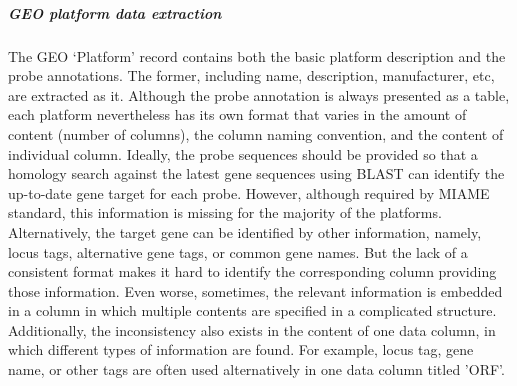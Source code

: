 \subparagraph{GEO platform data extraction}
%
The GEO `Platform' record contains both the basic platform description and the
probe annotations.
%
The former, including name, description, manufacturer, etc, are extracted as
it.
%
Although the probe annotation is always presented as a table, each platform
nevertheless has its own format that varies in the amount of content (number
of columns), the column naming convention, and the content of individual
column.
%
Ideally, the probe sequences should be provided so that a homology search
against the latest gene sequences using BLAST \cite{Altschul1997} can identify
the up-to-date gene target for each probe.
%
However, although required by MIAME\cite{Brazma2001} standard, this information
is missing for the majority of the platforms.
%
Alternatively, the target gene can be identified by other information, namely,
locus tags, alternative gene tags, or common gene names.
%
But the lack of a consistent format makes it hard to identify the corresponding
column providing those information.
%
Even worse, sometimes, the relevant information is embedded in a column in
which multiple contents are specified in a complicated structure.
%
Additionally, the inconsistency also exists in the content of one data column,
in which different types of information are found.
%
For example, locus tag, gene name, or other tags are often used
alternatively in one data column titled 'ORF'.


